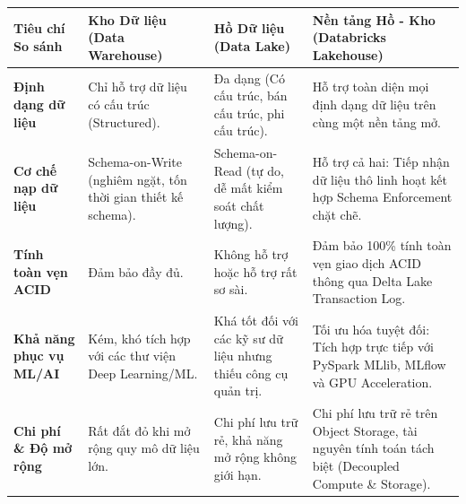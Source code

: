 \documentclass[
  13pt,
  a4paper,
]{report}
\newcounter{none} %
\begin{document}
{\def\LTcaptype{none} %
\begin{longtable}[]{@{}
  >{\raggedright\arraybackslash}p{}
  >{\raggedright\arraybackslash}p{}
  >{\raggedright\arraybackslash}p{}
  >{\raggedright\arraybackslash}p{}@{}}
\toprule\noalign{}
\begin{minipage}[b]{\linewidth}\raggedright
Tiêu chí So sánh
\end{minipage} & \begin{minipage}[b]{\linewidth}\raggedright
Kho Dữ liệu (Data Warehouse)
\end{minipage} & \begin{minipage}[b]{\linewidth}\raggedright
Hồ Dữ liệu (Data Lake)
\end{minipage} & \begin{minipage}[b]{\linewidth}\raggedright
Nền tảng Hồ - Kho (Databricks Lakehouse)
\end{minipage} \\
\midrule\noalign{}
\endhead
\bottomrule\noalign{}
\endlastfoot
\textbf{Định dạng dữ liệu} & Chỉ hỗ trợ dữ liệu có cấu trúc
(Structured). & Đa dạng (Có cấu trúc, bán cấu trúc, phi cấu trúc). & Hỗ
trợ toàn diện mọi định dạng dữ liệu trên cùng một nền tảng mở. \\
\textbf{Cơ chế nạp dữ liệu} & Schema-on-Write (nghiêm ngặt, tốn thời
gian thiết kế schema). & Schema-on-Read (tự do, dễ mất kiểm soát chất
lượng). & Hỗ trợ cả hai: Tiếp nhận dữ liệu thô linh hoạt kết hợp Schema
Enforcement chặt chẽ. \\
\textbf{Tính toàn vẹn ACID} & Đảm bảo đầy đủ. & Không hỗ trợ hoặc hỗ trợ
rất sơ sài. & Đảm bảo 100\% tính toàn vẹn giao dịch ACID thông qua Delta
Lake Transaction Log. \\
\textbf{Khả năng phục vụ ML/AI} & Kém, khó tích hợp với các thư viện
Deep Learning/ML. & Khá tốt đối với các kỹ sư dữ liệu nhưng thiếu công
cụ quản trị. & Tối ưu hóa tuyệt đối: Tích hợp trực tiếp với PySpark
MLlib, MLflow và GPU Acceleration. \\
\textbf{Chi phí \& Độ mở rộng} & Rất đắt đỏ khi mở rộng quy mô dữ liệu
lớn. & Chi phí lưu trữ rẻ, khả năng mở rộng không giới hạn. & Chi phí
lưu trữ rẻ trên Object Storage, tài nguyên tính toán tách biệt
(Decoupled Compute \& Storage). \\
\end{longtable}
}
\end{document}
